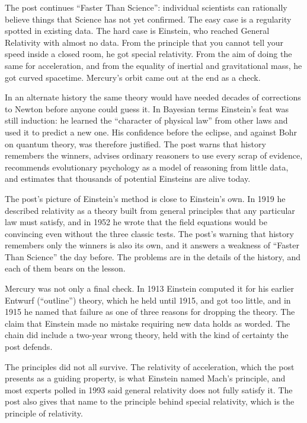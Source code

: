 \begin{afterword}
\summaryhead

The post continues ``Faster Than Science'': individual scientists can rationally believe things that Science has not yet confirmed. The easy case is a regularity spotted in existing data. The hard case is Einstein, who reached General Relativity with almost no data. From the principle that you cannot tell your speed inside a closed room, he got special relativity. From the aim of doing the same for acceleration, and from the equality of inertial and gravitational mass, he got curved spacetime. Mercury's orbit came out at the end as a check.

In an alternate history the same theory would have needed decades of corrections to Newton before anyone could guess it. In Bayesian terms Einstein's feat was still induction: he learned the ``character of physical law'' from other laws and used it to predict a new one. His confidence before the eclipse, and against Bohr on quantum theory, was therefore justified. The post warns that history remembers the winners, advises ordinary reasoners to use every scrap of evidence, recommends evolutionary psychology as a model of reasoning from little data, and estimates that thousands of potential Einsteins are alive today.

\responsehead

The post's picture of Einstein's method is close to Einstein's own. In 1919 he described relativity as a theory built from general principles that any particular law must satisfy, and in 1952 he wrote that the field equations would be convincing even without the three classic tests. The post's warning that history remembers only the winners is also its own, and it answers a weakness of ``Faster Than Science'' the day before. The problems are in the details of the history, and each of them bears on the lesson.

Mercury was not only a final check. In 1913 Einstein computed it for his earlier Entwurf (``outline'') theory, which he held until 1915, and got too little, and in 1915 he named that failure as one of three reasons for dropping the theory. The claim that Einstein made no mistake requiring new data holds as worded. The chain did include a two-year wrong theory, held with the kind of certainty the post defends.

The principles did not all survive. The relativity of acceleration, which the post presents as a guiding property, is what Einstein named Mach's principle, and most experts polled in 1993 said general relativity does not fully satisfy it. The post also gives that name to the principle behind special relativity, which is the principle of relativity.


\end{afterword}
